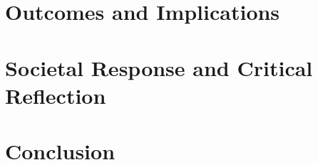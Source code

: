 \documentclass[12pt,a4paper]{article}
\begin{document}
\section{Outcomes and Implications}

\section{Societal Response and Critical Reflection}

\section{Conclusion}

\clearpage



\end{document}
